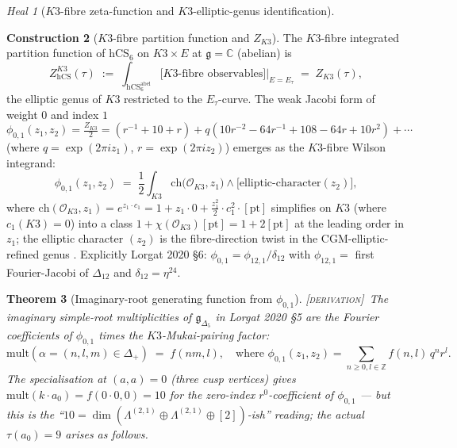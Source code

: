 \documentclass[11pt]{amsart}
\providecommand{\C}{\mathbb{C}}
\providecommand{\Z}{\mathbb{Z}}
\providecommand{\cO}{\mathcal{O}}
\providecommand{\g}{\mathfrak{g}}
\providecommand{\hCS}{\mathrm{hCS}}
\providecommand{\Gdelta}{\mathfrak{g}_{\Delta_{5}}}
\providecommand{\ClaimStatusDerivation}{\textsc{[derivation]}}
\theoremstyle{plain}
\newtheorem{theorem}{Theorem}[section]
\theoremstyle{definition}
\newtheorem{construction}[theorem]{Construction}
\theoremstyle{remark}
\newtheorem{heal}[theorem]{Heal}
\begin{document}
\begin{heal}[$K3$-fibre zeta-function and $K3$-elliptic-genus identification]
\label{heal:5}
\end{heal}

\begin{construction}[$K3$-fibre partition function and $Z_{K3}$]
\label{cons:K3-Z}
The $K3$-fibre integrated partition function of hCS$_{6}$ on
$K3\times E$ at $\g = \C$ (abelian) is
\begin{equation}\label{eq:Zfibre}
Z^{K3}_{\hCS}(\tau) \;:=\; \int_{\mathrm{hCS}_{6}^{\mathrm{abel}}} \bigl[
\text{$K3$-fibre observables}\bigr]\bigg|_{E = E_{\tau}} \;=\; Z_{K3}(\tau),
\end{equation}
the elliptic genus of $K3$ restricted to the $E_{\tau}$-curve. The
weak Jacobi form of weight $0$ and index $1$
\[
\phi_{0,1}(z_{1}, z_{2}) = \tfrac{Z_{K3}}{2} = (r^{-1}+10+r) +
q(10r^{-2} - 64r^{-1}+108-64r+10r^{2})+\cdots
\]
(where $q = \exp(2\pi i z_{1})$, $r=\exp(2\pi i z_{2})$) emerges as the
$K3$-fibre Wilson integrand:
\[
\phi_{0,1}(z_{1}, z_{2}) \;=\; \frac{1}{2}\int_{K3}
\mathrm{ch}\bigl(\cO_{K3}, z_{1}\bigr)\wedge \bigl[
\text{elliptic-character}(z_{2})\bigr],
\]
where $\mathrm{ch}(\cO_{K3}, z_{1}) = e^{z_{1}\cdot c_{1}} =
1 + z_{1}\cdot 0 + \tfrac{z_{1}^{2}}{2}\cdot c_{1}^{2}\cdot
[\mathrm{pt}]$ simplifies on $K3$ (where $c_{1}(K3)=0$) into a class
$1 + \chi(\cO_{K3})[\mathrm{pt}] = 1 + 2[\mathrm{pt}]$ at the
leading order in $z_{1}$; the elliptic character $(z_{2})$ is the
fibre-direction twist in the CGM-elliptic-refined genus
\cite{Gritsenko1999}. Explicitly Lorgat 2020 \S6: $\phi_{0,1} =
\phi_{12,1}/\delta_{12}$ with $\phi_{12,1} = $ first Fourier-Jacobi
of $\Delta_{12}$ and $\delta_{12} = \eta^{24}$.
\end{construction}

\begin{theorem}[Imaginary-root generating function from $\phi_{0,1}$]
\label{thm:im-root-gen}
\ClaimStatusDerivation\
The imaginary simple-root multiplicities of $\Gdelta$ in Lorgat 2020
\S5 are the Fourier coefficients of $\phi_{0,1}$ times the
$K3$-Mukai-pairing factor:
\begin{equation}\label{eq:multi-formula}
\mathrm{mult}(\alpha = (n, l, m)\in \Delta_{+}) \;=\; f(nm, l),
\quad \text{where } \phi_{0,1}(z_{1}, z_{2}) = \sum_{n\geq 0, l\in\Z}
f(n, l)\, q^{n} r^{l}.
\end{equation}
The specialisation at $(a,a)=0$ (three cusp vertices) gives
$\mathrm{mult}(k\cdot a_{0}) = f(0\cdot 0, 0) = 10$ for the
zero-index $r^{0}$-coefficient of $\phi_{0,1}$ --- but this is the
``$10 = \dim(\Lambda^{(2,1)}\oplus \Lambda^{(2,1)}\oplus [2])$-ish''
reading; the actual $\tau(a_{0}) = 9$ arises as follows.
\end{theorem}
\end{document}
